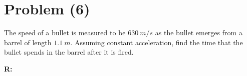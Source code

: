 \section{Problem (6)}
	The speed of a bullet is measured to be $630 \ m/s$ as the bullet emerges from a barrel of length $1.1 \ m$. Assuming constant acceleration, find the time that the bullet spends in the barrel after it is fired.

	\textbf{R:} \newline
